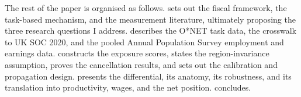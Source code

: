 The rest of the paper is organised as follows.  sets out the fiscal framework, the task-based mechanism, and the measurement literature, ultimately proposing the three research questions I address.  describes the O*NET task data, the crosswalk to UK SOC 2020, and the pooled Annual Population Survey employment and earnings data.  constructs the exposure scores, states the region-invariance assumption, proves the cancellation results, and sets out the calibration and propagation design.  presents the differential, its anatomy, its robustness, and its translation into productivity, wages, and the net position.  concludes.